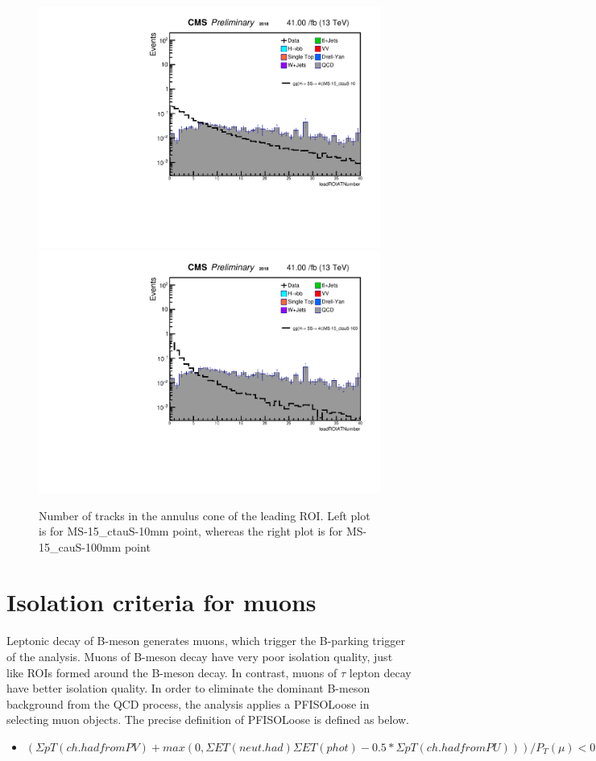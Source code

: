  \begin{figure}[h!]
   \caption{Number of tracks in the annulus cone of the leading ROI. Left plot is for MS-15\_ctauS-10mm point, whereas the right plot is for MS-15\_cauS-100mm point}
   \label{fig:ANleadSize}
   \centering
   \includegraphics[width=0.47\linewidth]{figs/AnalysisNoteplot_MS-15_ctauS-10_leadROIATNumber.pdf}
   \includegraphics[width=0.47\linewidth]{figs/AnalysisNoteplot_MS-15_ctauS-100_leadROIATNumber.pdf}
 \end{figure}




\section{Isolation criteria for muons}\label{ref:muISO}
Leptonic decay of B-meson generates muons, which trigger the B-parking trigger of the analysis.
Muons of B-meson decay have very poor isolation quality, just like ROIs formed around the B-meson decay.
In contrast, muons of $\tau$ lepton decay have better isolation quality.
In order to eliminate the dominant B-meson background from the QCD process, the analysis applies a PFISOLoose in selecting muon objects.
The precise definition of PFISOLoose is defined as below.
\begin{itemize}
  \item $(\Sigma pT(ch.had from PV)+max(0,\Sigma ET(neut.had) \Sigma ET (phot)-0.5* \Sigma pT(ch.had from PU)))/P_{T}(\mu)<0.25$
\end{itemize}

